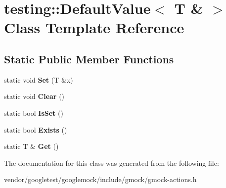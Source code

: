 \hypertarget{classtesting_1_1_default_value_3_01_t_01_6_01_4}{}\section{testing\+:\+:Default\+Value$<$ T \& $>$ Class Template Reference}
\label{classtesting_1_1_default_value_3_01_t_01_6_01_4}
\subsection*{Static Public Member Functions}
\begin{DoxyCompactItemize}
\item 
\mbox{\label{classtesting_1_1_default_value_3_01_t_01_6_01_4_a9863abf3d311ce5007d7e57dfce2f252}} 
static void {\bfseries Set} (T \&x)
\item 
\mbox{\label{classtesting_1_1_default_value_3_01_t_01_6_01_4_a3c8f9f81e591370f9b33798f58ca1a10}} 
static void {\bfseries Clear} ()
\item 
\mbox{\label{classtesting_1_1_default_value_3_01_t_01_6_01_4_a3e61547c2f0141cc8004385f3a9c817d}} 
static bool {\bfseries Is\+Set} ()
\item 
\mbox{\label{classtesting_1_1_default_value_3_01_t_01_6_01_4_a38420499e17d2fb4146ae6c4265f0d55}} 
static bool {\bfseries Exists} ()
\item 
\mbox{\label{classtesting_1_1_default_value_3_01_t_01_6_01_4_a1310448dd8c171aecfcbf7c8df5de7bd}} 
static T \& {\bfseries Get} ()
\end{DoxyCompactItemize}


The documentation for this class was generated from the following file\+:\begin{DoxyCompactItemize}
\item 
vendor/googletest/googlemock/include/gmock/gmock-\/actions.\+h\end{DoxyCompactItemize}
